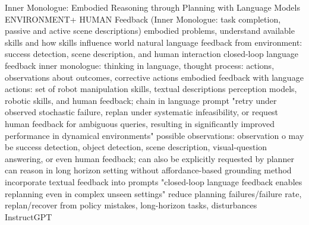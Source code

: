 \documentclass{article}
\begin{document}
\cite{huang_inner_2022} Inner Monologue: Embodied Reasoning through Planning with Language Models
ENVIRONMENT+ HUMAN Feedback
(Inner Monologue: task completion, passive and active scene descriptions)
embodied problems, understand available skills and how skills influence world
natural language feedback from environment: success detection, scene description, and human interaction
closed-loop language feedback
inner monologue: thinking in language, thought process: actions, observations about outcomes, corrective actions
embodied feedback with language
actions: set of robot manipulation skills, textual descriptions
perception models, robotic skills, and human feedback; chain in language prompt
"retry under observed stochastic failure, replan under systematic infeasibility, or request human feedback for ambiguous queries, resulting in significantly improved performance in dynamical environments"
possible observations: observation o may be success detection, object detection, scene description, visual-question answering, or even human feedback; can also be explicitly requested by planner
can reason in long horizon setting without affordance-based grounding method
incorporate textual feedback into prompts
"closed-loop language feedback enables replanning even in complex unseen settings"
reduce planning failures/failure rate, replan/recover from policy mistakes, long-horizon tasks, disturbances
InstructGPT
\end{document}
